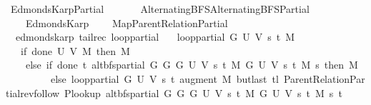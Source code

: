 %
\begin{isabellebody}%
%
%
\isadelimtheory
%
\endisadelimtheory
%
\isatagtheory
{}\isamarkupfalse%
\ Edmonds{\isacharunderscore}{\kern0pt}Karp{\isacharunderscore}{\kern0pt}Partial\isanewline
\ \ \isanewline
\ \ \ \ {\isachardoublequoteopen}{\isachardot}{\kern0pt}{\isachardot}{\kern0pt}{\isacharslash}{\kern0pt}Alternating{\isacharunderscore}{\kern0pt}BFS{\isacharslash}{\kern0pt}Alternating{\isacharunderscore}{\kern0pt}BFS{\isacharunderscore}{\kern0pt}Partial{\isachardoublequoteclose}\isanewline
\ \ \ \ Edmonds{\isacharunderscore}{\kern0pt}Karp\isanewline
\ \ \ \ {\isachardoublequoteopen}{\isachardot}{\kern0pt}{\isachardot}{\kern0pt}{\isacharslash}{\kern0pt}Map{\isacharslash}{\kern0pt}Parent{\isacharunderscore}{\kern0pt}Relation{\isacharunderscore}{\kern0pt}Partial{\isachardoublequoteclose}\isanewline
{}%
\endisatagtheory
{\isafoldtheory}%
%
\isadelimtheory
\isanewline
%
\endisadelimtheory
\isanewline
{}\isamarkupfalse%
\ {\isacharparenleft}{\kern0pt}\ edmonds{\isacharunderscore}{\kern0pt}karp{\isacharparenright}{\kern0pt}\ {\isacharparenleft}{\kern0pt}tailrec{\isacharparenright}{\kern0pt}\ loop{\isacharprime}{\kern0pt}{\isacharunderscore}{\kern0pt}partial\ \isanewline
\ \ {\isachardoublequoteopen}loop{\isacharprime}{\kern0pt}{\isacharunderscore}{\kern0pt}partial\ G\ U\ V\ s\ t\ M\ {\isacharequal}{\kern0pt}\isanewline
\ \ \ {\isacharparenleft}{\kern0pt}if\ done{\isacharunderscore}{\kern0pt}{}\ U\ V\ M\ then\ M\isanewline
\ \ \ \ else\ if\ done{\isacharunderscore}{\kern0pt}{}\ t\ {\isacharparenleft}{\kern0pt}alt{\isacharunderscore}{\kern0pt}bfs{\isacharunderscore}{\kern0pt}partial\ {\isacharparenleft}{\kern0pt}G{}\ G\ {\isacharparenleft}{\kern0pt}G{}\ U\ V\ s\ t\ M{\isacharparenright}{\kern0pt}{\isacharparenright}{\kern0pt}\ {\isacharparenleft}{\kern0pt}G{}\ U\ V\ s\ t\ M{\isacharparenright}{\kern0pt}\ s{\isacharparenright}{\kern0pt}\ then\ M\isanewline
\ \ \ \ \ \ \ \ \ else\ loop{\isacharprime}{\kern0pt}{\isacharunderscore}{\kern0pt}partial\ G\ U\ V\ s\ t\ {\isacharparenleft}{\kern0pt}augment\ M\ {\isacharparenleft}{\kern0pt}butlast\ {\isacharparenleft}{\kern0pt}tl\ {\isacharparenleft}{\kern0pt}Parent{\isacharunderscore}{\kern0pt}Relation{\isacharunderscore}{\kern0pt}Partial{\isachardot}{\kern0pt}rev{\isacharunderscore}{\kern0pt}follow\ {\isacharparenleft}{\kern0pt}P{\isacharunderscore}{\kern0pt}lookup\ {\isacharparenleft}{\kern0pt}alt{\isacharunderscore}{\kern0pt}bfs{\isacharunderscore}{\kern0pt}partial\ {\isacharparenleft}{\kern0pt}G{}\ G\ {\isacharparenleft}{\kern0pt}G{}\ U\ V\ s\ t\ M{\isacharparenright}{\kern0pt}{\isacharparenright}{\kern0pt}\ {\isacharparenleft}{\kern0pt}G{}\ U\ V\ s\ t\ M{\isacharparenright}{\kern0pt}\ s{\isacharparenright}{\kern0pt}{\isacharparenright}{\kern0pt}\ t{\isacharparenright}{\kern0pt}{\isacharparenright}{\kern0pt}{\isacharparenright}{\kern0pt}{\isacharparenright}{\kern0pt}{\isacharparenright}{\kern0pt}{\isachardoublequoteclose}\isanewline

\end{isabellebody}
